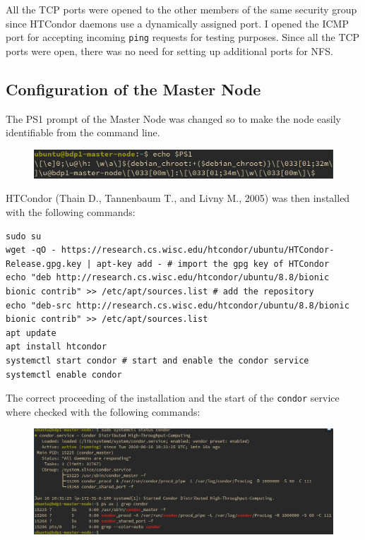 \documentclass{article}
\begin{document}
All the TCP ports were opened to the other members of the same security group since HTCondor daemons use a dynamically assigned port.
I opened the ICMP port for accepting incoming \texttt{ping} requests for testing purposes.
Since all the TCP ports were open, there was no need for setting up additional ports for NFS.

\subsection{Configuration of the Master Node}
The PS1 prompt of the Master Node was changed so to make the node easily identifiable from the command line.

\begin{figure}[!h]
    \center
    \includegraphics[width=\textwidth]{./images/master-ps1.png}
\end{figure}
\FloatBarrier

HTCondor (Thain D., Tannenbaum T., and Livny M., 2005) was then installed with the following commands:

\begin{lstlisting}
sudo su
wget -qO - https://research.cs.wisc.edu/htcondor/ubuntu/HTCondor-Release.gpg.key | apt-key add - # import the gpg key of HTCondor
echo "deb http://research.cs.wisc.edu/htcondor/ubuntu/8.8/bionic bionic contrib" >> /etc/apt/sources.list # add the repository
echo "deb-src http://research.cs.wisc.edu/htcondor/ubuntu/8.8/bionic bionic contrib" >> /etc/apt/sources.list
apt update
apt install htcondor
systemctl start condor # start and enable the condor service
systemctl enable condor
\end{lstlisting}

The correct proceeding of the installation and the start of the \texttt{condor} service where checked with the following commands:

\begin{figure}[!h]
    \center
    \includegraphics[width=\textwidth]{./images/condor_installed.png}
\end{figure}
\end{document}
